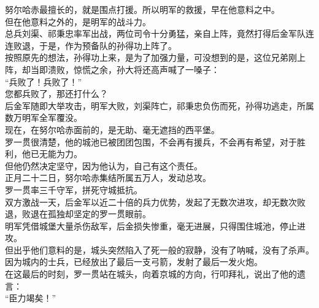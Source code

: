 \begin{multicols}{\theparacolNo}
努尔哈赤最擅长的，就是围点打援。所以明军的救援，早在他意料之中。\\

但在他意料之外的，是明军的战斗力。\\

总兵刘渠、祁秉忠率军出战，两位司令十分勇猛，亲自上阵，竟然打得后金军队连连败退，于是，作为预备队的孙得功上阵了。\\

按照原先的想法，孙得功上来，是为了加强力量，可没想到的是，这位兄弟刚上阵，却当即溃败，惊慌之余，孙大将还高声喊了一嗓子：\\

“兵败了！兵败了！”\\

您都兵败了，那还打什么？\\

后金军随即大举攻击，明军大败，刘渠阵亡，祁秉忠负伤而死，孙得功逃走，所属数万明军全军覆没。\\

现在，在努尔哈赤面前的，是无助、毫无遮挡的西平堡。\\

罗一贯很清楚，他的城池已被团团包围，不会再有援兵，不会再有希望，对于胜利，他已无能为力。\\

但他仍然决定坚守，因为他认为，自己有这个责任。\\

正月二十二日，努尔哈赤集结所属五万人，发动总攻。\\

罗一贯率三千守军，拼死守城抵抗。\\

双方激战一天，后金军以近二十倍的兵力优势，发起了无数次进攻，却无数次败退，败退在孤独却坚定的罗一贯眼前。\\

明军凭借城堡大量杀伤敌军，后金损失惨重，毫无进展，只得围住城池，停止进攻。\\

但出乎他们意料的是，城头突然陷入了死一般的寂静，没有了呐喊，没有了杀声。\\

因为城内的士兵，已经放出了最后一支弓箭，发射了最后一发火炮。\\

在这最后的时刻，罗一贯站在城头，向着京城的方向，行叩拜礼，说出了他的遗言：\\

“臣力竭矣！”\\


\end{multicols}
